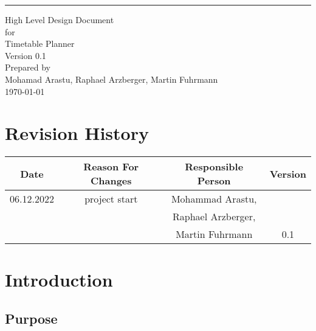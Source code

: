 \documentclass{scrreprt}
\date{}
\def\myversion{0.1}
\begin{document}
	
	\begin{flushright}
		\rule{16cm}{5pt}\vskip1cm
		\begin{bfseries}
			\Huge{High Level Design Document}\\
			\vspace{1.9cm}
			for\\
			\vspace{1.9cm}
			Timetable Planner\\
			\vspace{1.9cm}
			\LARGE{Version \myversion}\\
			\vspace{1.9cm}
			Prepared by \\ {\small Mohamad Arastu, Raphael Arzberger, Martin Fuhrmann}
			\vspace{1.9cm} \\
			\today\\
		\end{bfseries}
	\end{flushright}
	
	\tableofcontents
	
	
	\chapter*{Revision History}
	
	\begin{center}
		\begin{tabular}{|c|c|c|c|}
			\hline
			Date & Reason For Changes & Responsible Person & Version\\
			\hline
			06.12.2022 & project start & Mohammad Arastu, & \\&&Raphael Arzberger, & \\&&Martin Fuhrmann & 0.1\\
			\hline
		\end{tabular}
	\end{center}
	
	\chapter{Introduction}
	
	\section{Purpose}
	
\end{document}
